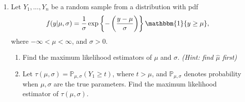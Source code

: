 \documentclass[11pt]{article}
\begin{document}
\begin{enumerate}
\item Let $Y_1,...,Y_n$ be a random sample from a distribution with pdf
$$f(y | \mu, \sigma) = \frac{1}{\sigma} \exp \left \lbrace - \left( \dfrac{y - \mu}{\sigma} \right) \right \rbrace \mathbbm{1}\{y \geq \mu \},$$
where $-\infty < \mu < \infty$, and $\sigma > 0$.

\begin{enumerate}
\item Find the maximum likelihood estimators of $\mu$ and $\sigma$. \textit{(Hint: find $\widehat{\mu}$ first)}

\item Let $\tau(\mu, \sigma) = \mathbb{P}_{\mu, \sigma}(Y_1 \geq t)$, where $t > \mu$, and $\mathbb{P}_{\mu, \sigma}$ denotes probability when $\mu, \sigma$ are the true parameters. Find the maximum likelihood estimator of $\tau(\mu, \sigma)$.
\end{enumerate}
\end{enumerate}
\end{document}
